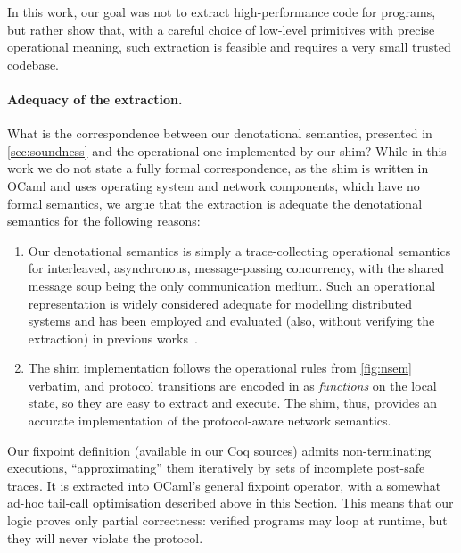 In this work, our goal was not to extract high-performance code for
\disel programs, but rather show that, with a careful choice of
low-level primitives with precise operational meaning, such extraction
is feasible and requires a very small trusted codebase.
%

\paragraph{Adequacy of the extraction.~}

What is the correspondence between our denotational semantics,
presented in \cref{sec:soundness} and the operational one
implemented by our shim?
%
%
While in this work we do not state a fully formal correspondence, as
the shim is written in OCaml and uses operating system and network
components, which have no formal semantics, we argue that the
extraction is adequate \wrt the denotational semantics for the
following reasons:

\begin{enumerate}

\item Our denotational semantics is simply a trace-collecting
  operational semantics for interleaved, asynchronous, message-passing
  concurrency, with the shared message soup being the only
  communication medium. Such an operational representation is widely
  considered adequate for modelling distributed systems and has been
  employed and evaluated (also, without verifying the extraction) in
  previous works~\cite{
    Wilcox-al:PLDI15,Hawblitzel-al:SOSP15,Padon-al:PLDI16}.

\item The shim implementation follows the operational rules from
  \cref{fig:nsem} verbatim, and protocol transitions are encoded
  in \disel as \emph{functions} on the local state, so they are easy
  to extract and execute. The shim, thus, provides an accurate
  implementation of the protocol-aware network semantics.

\end{enumerate}

\noindent
%
Our fixpoint definition (available in our Coq sources) admits
non-terminating executions, ``approximating'' them iteratively by sets
of incomplete post-safe traces. It is extracted into OCaml's general
fixpoint operator, with a somewhat ad-hoc tail-call optimisation
described above in this Section. This means that our logic proves only
partial correctness: verified programs may loop at runtime, but they
will never violate the protocol.

